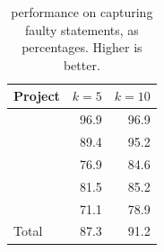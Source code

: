 \documentclass{article}
\begin{document}
\begin{table}[tb]
  \small
	\centering
	\setlength{\tabcolsep}{4pt}
	\begin{tabular}{lrr}
		\toprule
		Project             &  \multicolumn{1}{c}{$k=5$} & \multicolumn{1}{c}{$k=10$} \\ %
		\midrule

        \lang{}            & 96.9 & 96.9\\
        \cmath{}           & 89.4 & 95.2\\
		\chart{}			& 76.9 & 84.6 \\
        \jtime{}            & 81.5 & 85.2\\
        \mockito{}          & 71.1 & 78.9\\\midrule
        Total          & 87.3 & 91.2\\


		\bottomrule
	\end{tabular}
	\caption { performance on capturing faulty statements, as
     percentages. Higher is better.}
   \label{tab:ds-cases-captured}

\end{table}


\end{document}

